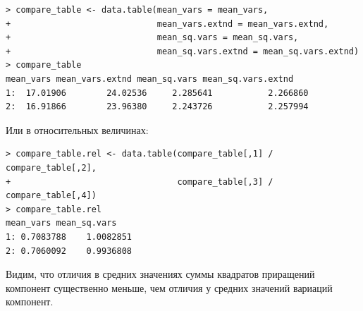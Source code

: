 \documentclass[14pt,a4paper]{scrartcl}
\begin{document}
\begin{verbatim}
> compare_table <- data.table(mean_vars = mean_vars,
+                             mean_vars.extnd = mean_vars.extnd,
+                             mean_sq.vars = mean_sq.vars,
+                             mean_sq.vars.extnd = mean_sq.vars.extnd)
> compare_table
mean_vars mean_vars.extnd mean_sq.vars mean_sq.vars.extnd
1:  17.01906        24.02536     2.285641           2.266860
2:  16.91866        23.96380     2.243726           2.257994
\end{verbatim}

Или в относительных величинах:

\begin{verbatim}
> compare_table.rel <- data.table(compare_table[,1] / compare_table[,2],
+                                 compare_table[,3] / compare_table[,4])
> compare_table.rel
mean_vars mean_sq.vars
1: 0.7083788    1.0082851
2: 0.7060092    0.9936808
\end{verbatim}

Видим, что отличия в средних значениях суммы квадратов приращений компонент существенно меньше, чем отличия у средних значений вариаций компонент.
\end{document}

